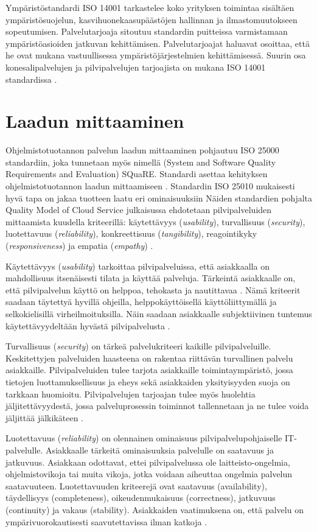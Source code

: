Ympäristöstandardi ISO 14001 tarkastelee koko yrityksen toimintaa sisältäen ympäristösuojelun, kasvihuonekaasupäästöjen hallinnan ja ilmastomuutokseen sopeutumisen. Palvelutarjoaja sitoutuu standardin puitteissa varmistamaan ympäristöasioiden jatkuvan kehittämisen. Palvelutarjoajat haluavat osoittaa, että he ovat mukana vastuullisessa ympäristöjärjestelmien kehittämisessä. Suurin osa konesalipalvelujen ja pilvipalvelujen tarjoajista on mukana ISO 14001 standardissa \citep{iso14000}.

\section{Laadun mittaaminen}
Ohjelmistotuotannon palvelun laadun mittaaminen pohjautuu ISO 25000 standardiin, joka tunnetaan myös nimellä (System and Software Quality Requirements and Evaluation) SQuaRE. Standardi asettaa kehityksen ohjelmistotuotannon laadun mittaamiseen \citep{iso25000}. Standardin ISO 25010 mukaisesti hyvä tapa on jakaa tuotteen laatu eri ominaisuuksiin \citep{iso25010} Näiden standardien pohjalta Quality Model of Cloud Service julkaisussa ehdotetaan pilvipalveluiden mittaamista kuudella kriteerillä: käytettävyys (\emph{usability}), turvallisuus (\emph{security}), luotettavuus (\emph{reliability}), konkreettisuus (\emph{tangibility}), reagointikyky (\emph{responsiveness}) ja empatia (\emph{empathy}) \citep{qualitymodel}.

Käytettävyys (\emph{usability}) tarkoittaa pilvipalveluissa, että asiakkaalla on mahdollisuus itsenäisesti tilata ja käyttää palveluja. Tärkeintä asiakkaalle on, että pilvipalvelun käyttö on helppoa, tehokasta ja nautittavaa \citep{adaptive}. Nämä kriteerit saadaan täytettyä hyvillä ohjeilla, helppokäyttöisellä käyttöliittymällä ja selkokielisillä virheilmoituksilla. Näin saadaan asiakkaalle subjektiivinen tuntemus käytettävyydeltään hyvästä pilvipalvelusta \citep{qualitymodel}.

Turvallisuus (\emph{security}) on tärkeä palvelukriteeri kaikille pilvipalveluille. Keskitettyjen palveluiden haasteena on rakentaa riittävän turvallinen palvelu asiakkaille. Pilvipalveluiden tulee tarjota asiakkaille toimintaympäristö, jossa tietojen luottamuksellisuus ja eheys sekä asiakkaiden yksityisyyden suoja on tarkkaan huomioitu. Pilvipalvelujen tarjoajan tulee myös huolehtia jäljitettävyydestä, jossa palveluprosessin toiminnot tallennetaan ja ne tulee voida jäljittää jälkikäteen \citep{qualitymodel}.

Luotettavuus (\emph{reliability}) on olennainen ominaisuus pilvipalvelupohjaiselle IT-palvelulle. Asiakkaalle tärkeitä ominaisuuksia palvelulle on saatavuus ja jatkuvuus. Asiakkaan odottavat, ettei pilvipalvelussa ole laitteisto-ongelmia, ohjelmistovikoja tai muita vikoja, jotka voidaan aiheuttaa ongelmia palvelun saatavuuteen. Luotettavuuden kriteerejä ovat saatavuus (availability), täydellisyys (completeness), oikeudenmukaisuus (correctness), jatkuvuus (continuity) ja vakaus (stability). Asiakkaiden vaatimuksena on, että palvelu on ympärivuorokautisesti saavutettavissa ilman katkoja \citep{qualitymodel}.

